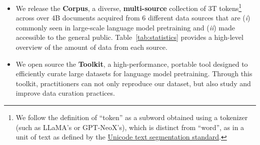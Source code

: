 \begin{itemize}[leftmargin=1em,topsep=1mm,itemsep=1mm]
    \item We release the \textbf{\dolma Corpus}, a diverse, \textbf{multi-source} collection of 3T tokens\footnote{We follow the definition of ``token'' as a subword obtained using a tokenizer (such as LLaMA’s or GPT-NeoX’s), which is distinct from ``word'', as in a unit of text as defined by the \href{https://unicode.org/reports/tr29/}{Unicode text segmentation standard}.} across over 4B documents acquired from 6 different data sources that are (\textit{i}) commonly seen in large-scale language model pretraining and (\textit{ii}) made accessible to the general public.  
    Table~\ref{tab:statistics} provides a high-level overview of the amount of data from each source.
    \item We open source the \textbf{\dolma Toolkit}, a high-performance, portable tool designed to efficiently curate large datasets for language model pretraining. 
    Through this toolkit, practitioners can not only reproduce our dataset, but also study and improve data curation practices. 
\end{itemize}







